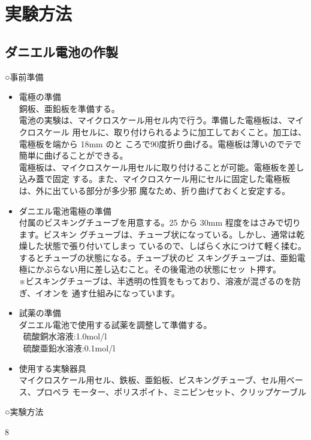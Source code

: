 \documentclass[11pt,a4j]{jarticle}
\begin{document}
\section{実験方法}
\subsection{ダニエル電池の作製}
○事前準備
\begin{itemize}
\item 電極の準備 \\
銅板、亜鉛板を準備する。\\ 電池の実験は、マイクロスケール用セル内で行う。準備した電極板は、マイクロスケール 用セルに、取り付けられるように加工しておくこと。加工は、電極板を端から 18mm のと ころで90度折り曲げる。電極板は薄いのでテで簡単に曲げることができる。 \\ 電極板は、マイクロスケール用セルに取り付けることが可能。電極板を差し込み蓋で固定 する。また、マイクロスケール用にセルに固定した電極板は、外に出ている部分が多少邪 魔なため、折り曲げておくと安定する。
\newpage
\item ダニエル電池電極の準備 \\
付属のビスキングチューブを用意する。25 から 30mm 程度をはさみで切ります。ビスキン グチューブは、チューブ状になっている。しかし、通常は乾燥した状態で張り付いてしまっ ているので、しばらく水につけて軽く揉む。するとチューブの状態になる。チューブ状のビ スキングチューブは、亜鉛電極にかぶらない用に差し込むこと。その後電池の状態にセッ ト押す。\\ ※ビスキングチューブは、半透明の性質をもっており、溶液が混ざるのを防ぎ、イオンを 通す仕組みになっています。 \\
\item 試薬の準備 \\
ダニエル電池で使用する試薬を調整して準備する。 \\
\ 硫酸銅水溶液:1.0mol/l \\
\ 硫酸亜鉛水溶液:0.1mol/l
\item 使用する実験器具 \\ マイクロスケール用セル、鉄板、亜鉛板、ビスキングチューブ、セル用ベース、プロペラ モーター、ポリスポイト、ミニピンセット、クリップケーブル
\end{itemize}
○実験方法 \par
8
\end{document}
